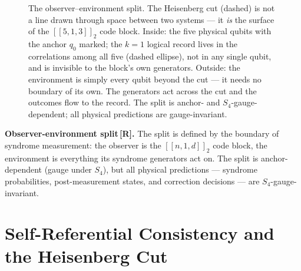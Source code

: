 \documentclass[11pt,a4paper]{article}
\newcommand{\Rmark}{\textcolor{green!50!black}{\textbf{[R]}}}
\newcommand{\Cq}[4]{[\![#1,#2,#3]\!]_{#4}}
\begin{document}
\begin{figure}[h]
\caption{The observer--environment split. The Heisenberg cut (dashed) is
not a line drawn through space between two systems --- it \emph{is} the
surface of the $\Cq{5}{1}{3}{2}$ code block. Inside: the five physical
qubits with the anchor $q_0$ marked; the $k=1$ logical record lives in the
correlations among all five (dashed ellipse), not in any single qubit, and
is invisible to the block's own generators. Outside: the environment is
simply every qubit beyond the cut --- it needs no boundary of its own. The
generators act across the cut and the outcomes flow to the record. The
split is anchor- and $S_4$-gauge-dependent; all physical predictions are
gauge-invariant.}
\label{fig:split}
\end{figure}

\begin{mdframed}[backgroundcolor=Rbg,linecolor=Rcolor,linewidth=1.5pt]
\textbf{Observer-environment split\,\Rmark.}\quad
The split is defined by the boundary of syndrome measurement: the observer is the $[\![n,1,d]\!]_2$ code block, the environment is everything its syndrome generators act on. The split is anchor-dependent (gauge under $S_4$), but all physical predictions --- syndrome probabilities, post-measurement states, and correction decisions --- are $S_4$-gauge-invariant.
\end{mdframed}

\section{Self-Referential Consistency and the Heisenberg Cut}
\label{sec:cut}
\end{document}
